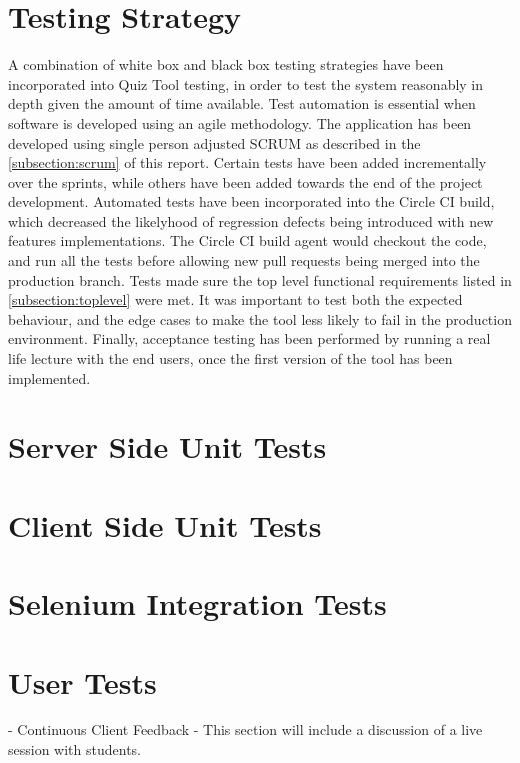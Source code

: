 \section{Testing Strategy}
A combination of white box and black box testing strategies have been incorporated
into Quiz Tool testing, in order to test the system reasonably in depth
given the amount of time available. Test automation is essential when software is developed
using an agile methodology. The application has been developed using single person adjusted
SCRUM as described in the \autoref{subsection:scrum} of this report. Certain tests have been
added incrementally over the sprints, while others have been added towards the end of the
project development. Automated tests have been incorporated into the Circle CI build,
which decreased the likelyhood of regression defects being introduced with new features implementations.
The Circle CI build agent would checkout the code, and run all the tests before allowing
new pull requests being merged into the production branch. Tests made sure the
top level functional requirements listed in \autoref{subsection:toplevel} were met.
It was important to test both the expected behaviour, and the edge cases to make the
tool less likely to fail in the production environment. Finally, acceptance testing
has been performed by running a real life lecture with the end users, once the first version of the
tool has been implemented.

\section{Server Side Unit Tests}
\section{Client Side Unit Tests}
\section{Selenium Integration Tests}
\section{User Tests}
- Continuous Client Feedback
- This section will include a discussion of a live session with students.

